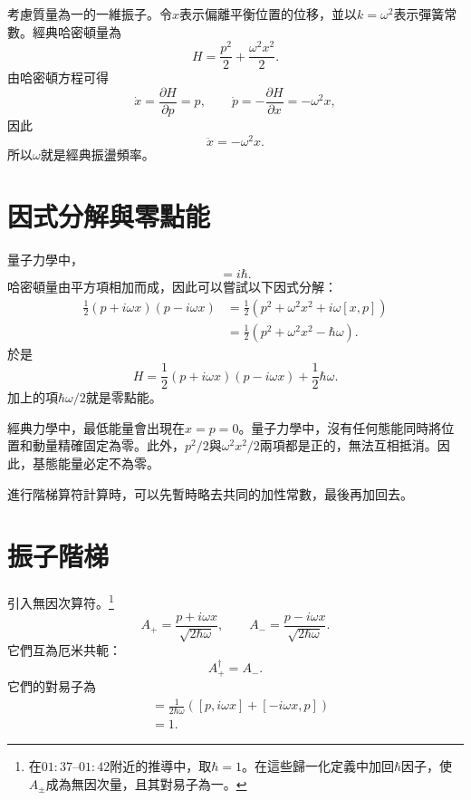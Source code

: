 考慮質量為一的一維振子。令\(x\)表示偏離平衡位置的位移，並以\(k=\omega^2\)表示彈簧常數。經典哈密頓量為
\begin{equation}
H=\frac{p^2}{2}+\frac{\omega^2x^2}{2}.
\end{equation}
由哈密頓方程可得
\begin{equation}
\dot{x}=\frac{\partial H}{\partial p}=p,
\qquad
\dot{p}=-\frac{\partial H}{\partial x}=-\omega^2x,
\end{equation}
因此
\begin{equation}
\ddot{x}=-\omega^2x.
\end{equation}
所以\(\omega\)就是經典振盪頻率。

\section{因式分解與零點能}

量子力學中，
\begin{equation}
[x,p]=i\hbar.
\end{equation}
哈密頓量由平方項相加而成，因此可以嘗試以下因式分解：
\begin{align}
\frac{1}{2}(p+i\omega x)(p-i\omega x)
&=\frac{1}{2}\left(p^2+\omega^2x^2+i\omega[x,p]\right) \\
&=\frac{1}{2}\left(p^2+\omega^2x^2-\hbar\omega\right).
\end{align}
於是
\begin{equation}
H=\frac{1}{2}(p+i\omega x)(p-i\omega x)
+\frac{1}{2}\hbar\omega.
\end{equation}
加上的項\(\hbar\omega/2\)就是零點能。

經典力學中，最低能量會出現在\(x=p=0\)。量子力學中，沒有任何態能同時將位置和動量精確固定為零。此外，\(p^2/2\)與\(\omega^2x^2/2\)兩項都是正的，無法互相抵消。因此，基態能量必定不為零。

進行階梯算符計算時，可以先暫時略去共同的加性常數，最後再加回去。

\begin{classroomqa}
\end{classroomqa}

\section{振子階梯}

引入無因次算符。\footnote{在\(01{:}37\)--\(01{:}42\)附近的推導中，取\(\hbar=1\)。在這些歸一化定義中加回\(\hbar\)因子，使\(A_\pm\)成為無因次量，且其對易子為一。}
\begin{equation}
A_+=\frac{p+i\omega x}{\sqrt{2\hbar\omega}},
\qquad
A_-=\frac{p-i\omega x}{\sqrt{2\hbar\omega}}.
\end{equation}
它們互為厄米共軛：
\begin{equation}
A_+^\dagger=A_-.
\end{equation}
它們的對易子為
\begin{align}
[A_-,A_+]
&=\frac{1}{2\hbar\omega}
\left([p,i\omega x]+[-i\omega x,p]\right) \\
&=1.
\end{align}

